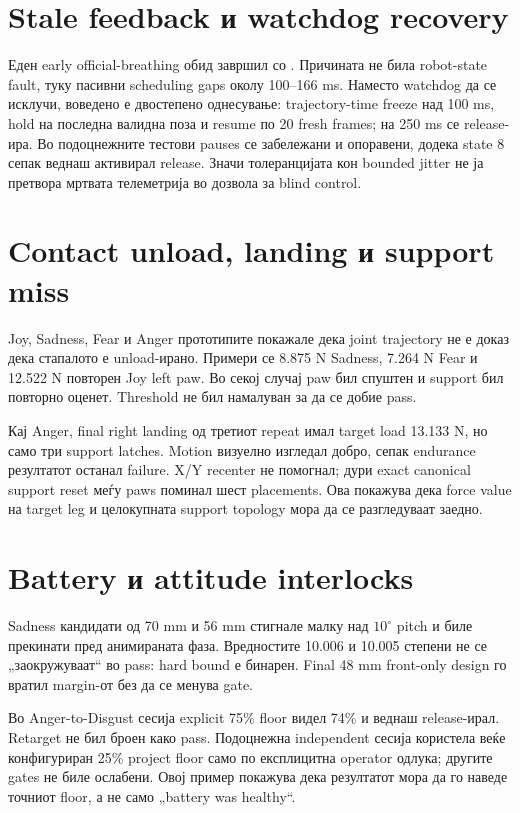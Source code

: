 \section{Stale feedback и watchdog recovery}

Еден early official-breathing обид завршил со
. Причината не била robot-state fault, туку
пасивни scheduling gaps околу 100--166 ms. Наместо watchdog да се исклучи,
воведено е двостепено однесување: trajectory-time freeze над 100 ms, hold на
последна валидна поза и resume по 20 fresh frames; на 250 ms се release-ира.
Во подоцнежните тестови pauses се забележани и опоравени, додека state 8
сепак веднаш активирал release. Значи толеранцијата кон bounded jitter не ја
претвора мртвата телеметрија во дозвола за blind control.

\section{Contact unload, landing и support miss}

Joy, Sadness, Fear и Anger прототипите покажале дека joint trajectory не е
доказ дека стапалото е unload-ирано. Примери се 8.875 N Sadness, 7.264 N Fear и
12.522 N повторен Joy left paw. Во секој случај paw бил спуштен и support бил
повторно оценет. Threshold не бил намалуван за да се добие pass.

Кај Anger, final right landing од третиот repeat имал target load 13.133 N,
но само три support latches. Motion визуелно изгледал добро, сепак endurance
резултатот останал failure. X/Y recenter не помогнал; дури exact canonical
support reset меѓу paws поминал шест placements. Ова покажува дека force value
на target leg и целокупната support topology мора да се разгледуваат заедно.

\section{Battery и attitude interlocks}

Sadness кандидати од 70 mm и 56 mm стигнале малку над $10^{\circ}$ pitch и
биле прекинати пред анимираната фаза. Вредностите 10.006 и 10.005 степени не се
„заокружуваат“ во pass: hard bound е бинарен. Final 48 mm front-only design го
вратил margin-от без да се менува gate.

Во Anger-to-Disgust сесија explicit 75\% floor видел 74\% и веднаш release-ирал.
Retarget не бил броен како pass. Подоцнежна independent сесија користела веќе
конфигуриран 25\% project floor само по експлицитна operator одлука; другите
gates не биле ослабени. Овој пример покажува дека резултатот мора да го наведе
точниот floor, а не само „battery was healthy“.

